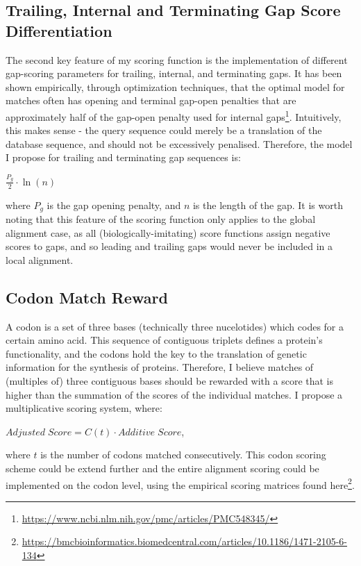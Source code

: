\documentclass[a4paper]{article}
\begin{document}
\subsection{Trailing, Internal and Terminating Gap Score Differentiation}
The second key feature of my scoring function is the implementation of different gap-scoring parameters for trailing, internal, and terminating gaps. It has been shown empirically, through optimization techniques, that the optimal model for matches often has opening and terminal gap-open penalties that are approximately half of the gap-open penalty used for internal gaps\footnote{\url{https://www.ncbi.nlm.nih.gov/pmc/articles/PMC548345/}}. Intuitively, this makes sense - the query sequence could merely be a translation of the database sequence, and should not be excessively penalised. Therefore, the model I propose for trailing and terminating gap sequences is:
\begin{center}
$\frac{P_g}{2} \cdot \ln(n) $
\end {center}
where $P_g$ is the gap opening penalty, and $n$ is the length of the gap.
 It is worth noting that this feature of the scoring function only applies to the global alignment case, as all (biologically-imitating) score functions assign negative scores to gaps, and so leading and trailing gaps would never be included in a local alignment. 
 
\subsection{Codon Match Reward}
A codon is a set of three bases (technically three nucelotides) which codes for a certain amino acid. This sequence of contiguous triplets defines a protein's functionality, and the codons hold the key to the translation of genetic information for the synthesis of proteins. Therefore, I believe matches of (multiples of) three contiguous bases should be rewarded with a score that is higher than the summation of the scores of the individual matches. I propose a multiplicative scoring system, where:
\begin{center}
$Adjusted\;Score = C(t) \cdot Additive\;Score $,
\end {center}
where $t$ is the number of codons matched consecutively. This codon scoring scheme could be extend further and the entire alignment scoring could be implemented on the codon level, using the empirical scoring matrices found here\footnote{\url{https://bmcbioinformatics.biomedcentral.com/articles/10.1186/1471-2105-6-134}}.
\end{document}
